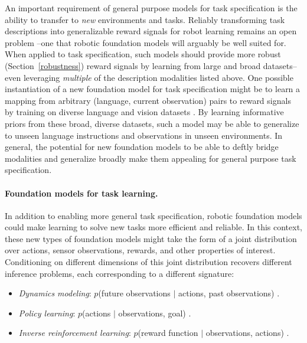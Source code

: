 An important requirement of general purpose models for task specification is the ability to transfer to \textit{new} environments and tasks. Reliably transforming task descriptions into generalizable reward signals for robot learning remains an open problem \citep{taylor2016alignment}--one that robotic foundation models will arguably be well suited for. When applied to task specification, such models should provide more robust (Section~\ref{robustness}) reward signals by learning from large and broad datasets--even leveraging \textit{multiple} of the description modalities listed above. One possible instantiation of a new foundation model for task specification might be to learn a mapping from arbitrary (language, current observation) pairs to reward signals by training on diverse language and vision datasets \citep{bahdanau2019reward, fu2019lang2goals, chen2021generalizable}. By learning informative priors from these broad, diverse datasets, such a model may be able to generalize to unseen language instructions and observations in unseen environments. In general, the potential for new foundation models to be able to deftly bridge modalities and generalize broadly make them appealing for general purpose task specification.

\paragraph{Foundation models for task learning.} In addition to enabling more general task specification, robotic foundation models could make learning to solve new tasks more efficient and reliable. In this context, these new types of foundation models might take the form of a joint distribution over actions, sensor observations, rewards, and other properties of interest. Conditioning on different dimensions of this joint distribution recovers different inference problems, each corresponding to a different signature:

\begin{itemize} 
    \item \textit{Dynamics modeling}: $p$(future observations $\mid$ actions, past observations) \citep{finn2017deep, hafner2019latent, wu2021greedy}.
    \item \textit{Policy learning}: $p$(actions $\mid$ observations, goal) \citep{kaelbling1993learning, schaul2015uvf, ding2019goal}.
    \item \textit{Inverse reinforcement learning}: $p$(reward function $\mid$ observations, actions) \citep{ng2000algorithms, ziebart2008maximum, finn2016guided}.
\end{itemize}

